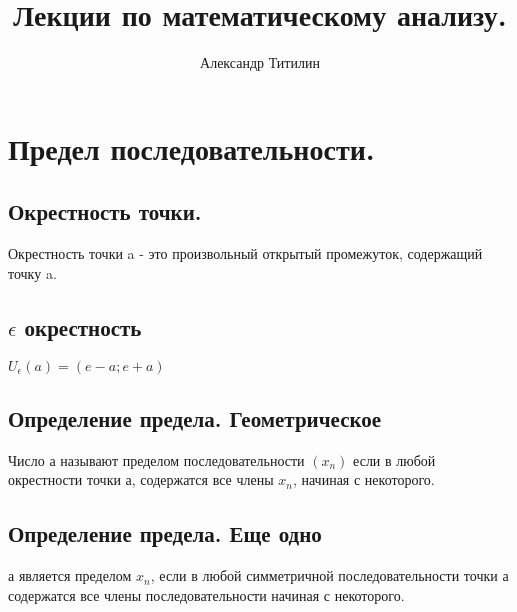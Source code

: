 \documentclass{article}
\title{Лекции по математическому анализу.}
\author{Александр Титилин}
\date{}
\begin{document}
\maketitle
\tableofcontents
%
%
%
%
\section{Предел последовательности.}
\subsection{Окрестность точки.}
Окрестность точки a - это произвольный открытый промежуток, содержащий точку a.
\subsection{$\epsilon$ окрестность}
$U_{\epsilon}(a) = ( e - a  ; e + a )$
\subsection{Определение предела. Геометрическое}
Число а называют пределом последовательности $(x_n)$ если в любой окрестности точки а,
содержатся все члены  $x_n$, начиная с некоторого.
\subsection{Определение предела. Еще одно}
а является пределом $x_n$, если в любой симметричной последовательности точки а содержатся все
члены последовательности начиная с некоторого.
\end{document}

